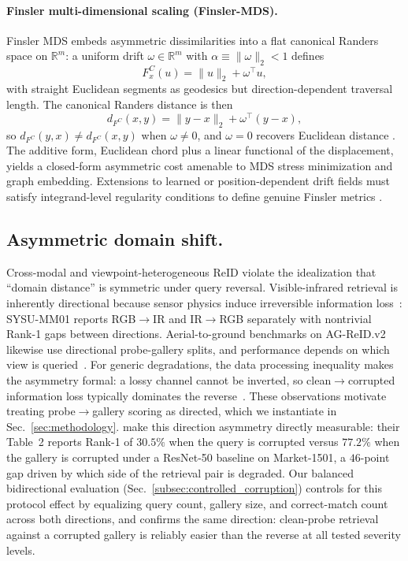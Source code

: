 \paragraph{Finsler multi-dimensional scaling (Finsler-MDS).} Finsler MDS \cite{dages2025finsler} embeds asymmetric dissimilarities into a flat canonical Randers space on $\mathbb{R}^m$: a uniform drift $\omega\in\mathbb{R}^m$ with $\alpha\equiv\|\omega\|_2<1$ defines
\begin{equation}
    F_x^{C}(u)=\|u\|_2+\omega^\top u ,
    \label{eq:finsler_norm}
\end{equation}
with straight Euclidean segments as geodesics but direction-dependent traversal length. The canonical Randers distance is then
\begin{equation}
    d_{F^{C}}(x,y)=\|y-x\|_2+\omega^\top (y-x) ,
    \label{eq:finsler_dist_canonical}
\end{equation}
so $d_{F^{C}}(y,x)\neq d_{F^{C}}(x,y)$ when $\omega\neq 0$, and $\omega=0$ recovers Euclidean distance \cite{dages2025finsler}. The additive form, Euclidean chord plus a linear functional of the displacement, yields a closed-form asymmetric cost amenable to MDS stress minimization and graph embedding. Extensions to learned or position-dependent drift fields must satisfy integrand-level regularity conditions to define genuine Finsler metrics \cite{bao2000introduction}. \\

\subsection{Asymmetric domain shift.} \label{subsec:assymmetric_domain_shift}
Cross-modal and viewpoint-heterogeneous ReID violate the idealization that ``domain distance'' is symmetric under query reversal. Visible-infrared retrieval is inherently directional because sensor physics induce irreversible information loss~\cite{wu2017rgb}: SYSU-MM01 reports RGB$\to$IR and IR$\to$RGB separately with nontrivial Rank-1 gaps between directions. Aerial-to-ground benchmarks on AG-ReID.v2 likewise use directional probe-gallery splits, and performance depends on which view is queried~\cite{nguyen2024agreidv2}. For generic degradations, the data processing inequality makes the asymmetry formal: a lossy channel cannot be inverted, so clean$\to$corrupted information loss typically dominates the reverse~\cite{cover2006elements}. These observations motivate treating probe$\to$gallery scoring as directed, which we instantiate in Sec.~\ref{sec:methodology}. \citet{chen2022benchmarks} make this direction asymmetry directly measurable: their Table~2 reports Rank-1 of $30.5\%$ when the query is corrupted versus $77.2\%$ when the gallery is corrupted under a ResNet-50 baseline on Market-1501, a $46$-point gap driven by which side of the retrieval pair is degraded. Our balanced bidirectional evaluation (Sec.~\ref{subsec:controlled_corruption}) controls for this protocol effect by equalizing query count, gallery size, and correct-match count across both directions, and confirms the same direction: clean-probe retrieval against a corrupted gallery is reliably easier than the reverse at all tested severity levels.

